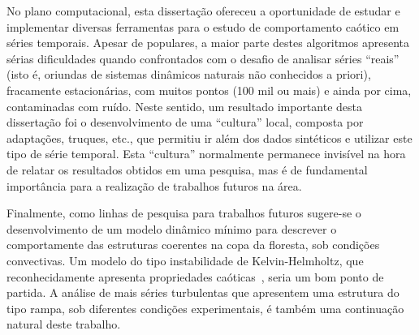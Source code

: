 No plano computacional, esta dissertação ofereceu a oportunidade de estudar e implementar diversas ferramentas para o estudo de comportamento caótico em séries temporais. Apesar de populares, a maior parte destes algoritmos apresenta sérias dificuldades quando confrontados com o desafio de analisar séries ``reais'' (isto é, oriundas de sistemas dinâmicos naturais não conhecidos a priori), fracamente estacionárias, com muitos pontos (100 mil ou mais) e ainda por cima, contaminadas com ruído. Neste sentido, um resultado importante desta dissertação foi o desenvolvimento de uma ``cultura'' local, composta por adaptações, truques, etc., que permitiu ir além dos dados sintéticos e utilizar este tipo de série temporal. Esta ``cultura'' normalmente
permanece invisível na hora de relatar os resultados obtidos em uma pesquisa, mas é de fundamental importância para a realização de trabalhos futuros na área.

Finalmente, como linhas de pesquisa para trabalhos futuros sugere-se o desenvolvimento de um modelo dinâmico mínimo para descrever o comportamente das estruturas coerentes na copa da floresta, sob condições convectivas. Um modelo do tipo instabilidade de Kelvin-Helmholtz, que reconhecidamente apresenta propriedades caóticas~\cite{malik/92}, seria um bom ponto de partida. A análise de mais séries turbulentas que apresentem uma estrutura do tipo rampa, sob diferentes condições experimentais, é também uma continuação natural deste trabalho.